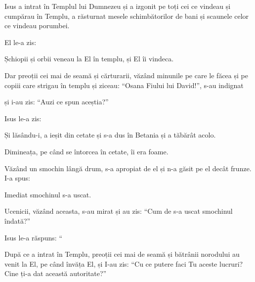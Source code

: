 {\par }{\PP {}Isus a intrat în Templul lui Dumnezeu și a izgonit pe toți cei ce vindeau și cumpărau în Templu, a răsturnat mesele schimbătorilor de bani și scaunele celor ce vindeau porumbei.

El le-a zis:
{}


\par }{\PP {}Șchiopii și orbii veneau la El în templu, și El îi vindeca.

Dar preoții cei mai de seamă și cărturarii, văzând minunile pe care le făcea și pe copiii care strigau în templu și ziceau: “Osana Fiului lui David!”, s-au indignat

și i-au zis: “Auzi ce spun aceștia?”

\par }{\PP Isus le-a zis:
{}


\par }{\PP {}Și lăsându-i, a ieșit din cetate și s-a dus în Betania și a tăbărât acolo.


\par }{\PP {}Dimineața, pe când se întorcea în cetate, îi era foame.

Văzând un smochin lângă drum, s-a apropiat de el și n-a găsit pe el decât frunze. I-a spus:
{}

\par }{\PP Imediat smochinul s-a uscat.


\par }{\PP {}Ucenicii, văzând aceasta, s-au mirat și au zis: “Cum de s-a uscat smochinul îndată?”


\par }{\PP {}Isus le-a răspuns: “{}



\par }{\PP {}După ce a intrat în Templu, preoții cei mai de seamă și bătrânii norodului au venit la El, pe când învăța El, și I-au zis: “Cu ce putere faci Tu aceste lucruri? Cine ți-a dat această autoritate?”


}

